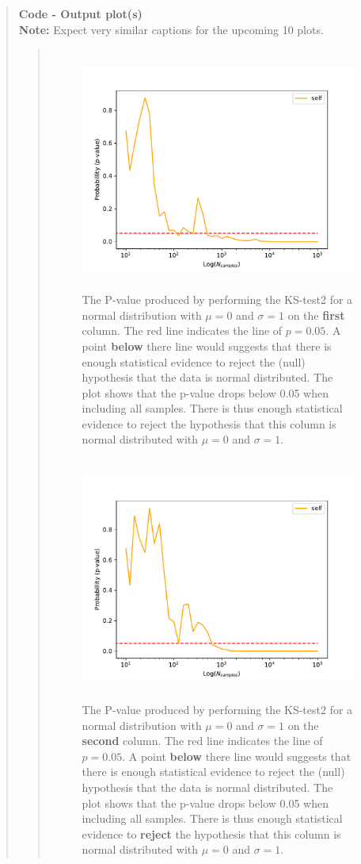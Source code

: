 \begin{quote}
\textbf{Code - Output plot(s)} \\
\textbf{Note:} Expect very similar captions for the upcoming 10 plots.
\begin{quote}
\begin{figure}[!ht]
\centering
\includegraphics[width=14cm, height=8cm]{./Plots/1e_plot_column_0.pdf}
\caption{The P-value produced by performing the KS-test2 for a normal distribution with $\mu = 0$ and $\sigma = 1$ on the \textbf{first} column.  The red line indicates the line of $ p = 0.05$. A point \textbf{below} there  line would suggests that there is enough statistical evidence to reject the (null) hypothesis that the data is normal distributed. The plot shows that the p-value drops below 0.05 when including all samples. There is thus enough statistical evidence to reject the hypothesis that this column is normal distributed with $\mu = 0$ and $\sigma = 1$.}
\end{figure}

\begin{figure}[!ht]
\centering
\includegraphics[width=14cm, height=8cm]{./Plots/1e_plot_column_1.pdf}
\caption{The P-value produced by performing the KS-test2 for a normal distribution with $\mu = 0$ and $\sigma = 1$ on the \textbf{second} column.  The red line indicates the line of $ p = 0.05$. A point \textbf{below} there  line would suggests that there is enough statistical evidence to reject the (null) hypothesis that the data is normal distributed. The plot shows that the p-value drops below 0.05 when including all samples. There is thus enough statistical evidence to \textbf{reject} the hypothesis that this column is normal distributed with $\mu = 0$ and $\sigma = 1$.}
\end{figure}
\newpage


\end{quote}
\end{quote}
